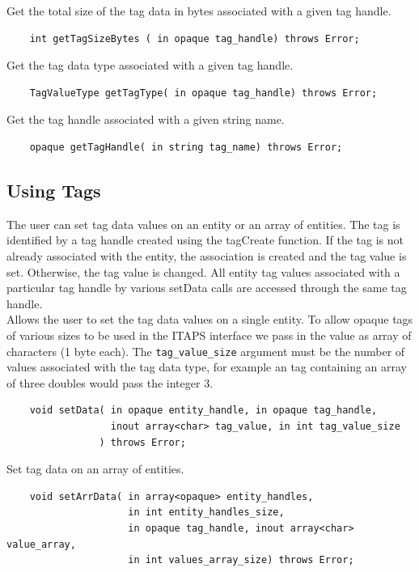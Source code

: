 \documentclass{article}
\begin{document}
Get the total size of the tag data in bytes associated with a 
given tag handle.
\begin{verbatim} 
    int getTagSizeBytes ( in opaque tag_handle) throws Error;
\end{verbatim}

Get the tag data type associated with a given tag handle.
\begin{verbatim} 
    TagValueType getTagType( in opaque tag_handle) throws Error;
\end{verbatim}

Get the tag handle associated with a given string name.
\begin{verbatim} 
    opaque getTagHandle( in string tag_name) throws Error;
\end{verbatim}

\subsection{Using Tags}

The user can set tag data values on an entity or an array of 
entities. The tag is identified by a tag handle created using 
the tagCreate function. If the tag is not already associated 
with the entity, the association is created and the tag value 
is set. Otherwise, the tag value is changed. All entity tag values 
associated with a particular tag handle by various setData calls 
are accessed through the same tag handle.\\


Allows the user to set the tag data values on a single entity. To 
allow opaque tags of various sizes to be used in the ITAPS interface 
we pass in the value as array of characters (1 byte each). The 
{\tt tag\_value\_size} argument must be the number of values associated 
with the tag data type, for example an tag containing an array 
of three doubles would pass the integer 3.

\begin{verbatim} 
    void setData( in opaque entity_handle, in opaque tag_handle, 
                  inout array<char> tag_value, in int tag_value_size
                ) throws Error; 
\end{verbatim} 

Set tag data on an array of entities. 

\begin{verbatim} 
    void setArrData( in array<opaque> entity_handles, 
                     in int entity_handles_size, 
                     in opaque tag_handle, inout array<char> value_array, 
                     in int values_array_size) throws Error;
\end{verbatim} 
\end{document}
